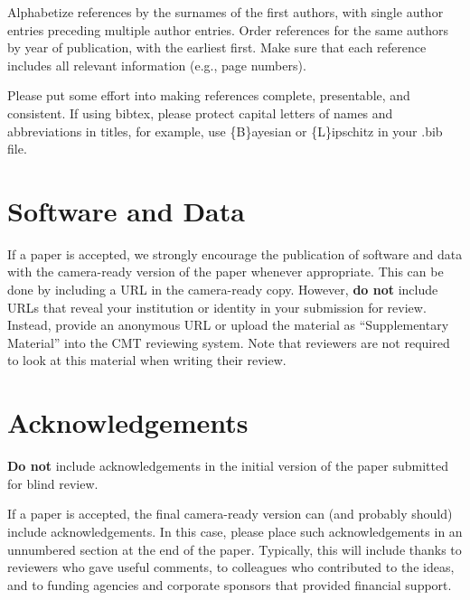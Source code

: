 \documentclass{article}
\begin{document}
Alphabetize references by the surnames of the first authors, with
single author entries preceding multiple author entries. Order
references for the same authors by year of publication, with the
earliest first. Make sure that each reference includes all relevant
information (e.g., page numbers).

Please put some effort into making references complete, presentable, and
consistent. If using bibtex, please protect capital letters of names and
abbreviations in titles, for example, use \{B\}ayesian or \{L\}ipschitz
in your .bib file.

\section*{Software and Data}

If a paper is accepted, we strongly encourage the publication of software and data with the
camera-ready version of the paper whenever appropriate. This can be
done by including a URL in the camera-ready copy. However, \textbf{do not}
include URLs that reveal your institution or identity in your
submission for review. Instead, provide an anonymous URL or upload
the material as ``Supplementary Material'' into the CMT reviewing
system. Note that reviewers are not required to look at this material
when writing their review.

\section*{Acknowledgements}

\textbf{Do not} include acknowledgements in the initial version of
the paper submitted for blind review.

If a paper is accepted, the final camera-ready version can (and
probably should) include acknowledgements. In this case, please
place such acknowledgements in an unnumbered section at the
end of the paper. Typically, this will include thanks to reviewers
who gave useful comments, to colleagues who contributed to the ideas,
and to funding agencies and corporate sponsors that provided financial
support.



\end{document}
